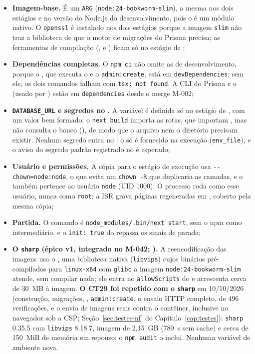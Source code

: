\begin{itemize}
  \item \textbf{Imagem-base.} É um \texttt{ARG} (\texttt{node:24-bookworm-slim}), a mesma nos dois estágios e na versão do Node.js do desenvolvimento, pois o  é um módulo nativo. O \texttt{openssl} é instalado nos dois estágios porque a imagem \texttt{slim} não traz a biblioteca de que o motor de migrações do Prisma precisa; as ferramentas de compilação (,  e ) ficam só no estágio de ;
  \item \textbf{Dependências completas.} O \texttt{npm ci} não omite as de desenvolvimento, porque o , que executa o  e o \texttt{admin:create}, está em \texttt{devDependencies}; sem ele, os dois comandos falham com \texttt{tsx: not found}. A CLI do Prisma e o  (usado por ) estão em \texttt{dependencies} desde o merge M-002;
  \item \textbf{\texttt{DATABASE\_URL} e segredos no .} A variável é definida só no estágio de , com um valor bem formado: o \texttt{next build} importa as rotas, que importam , mas não consulta o banco (), de modo que o arquivo nem o diretório precisam existir. Nenhum segredo entra no : o  só é fornecido na execução (\texttt{env\_file}), e o aviso do segredo padrão registrado no  é esperado;
  \item \textbf{Usuário e permissões.} A cópia para o estágio de execução usa \texttt{-{}-chown=node:node}, o que evita um \texttt{chown -R} que duplicaria as camadas, e o  também pertence ao usuário \texttt{node} (UID 1000). O processo roda como esse usuário, nunca como \texttt{root}; a ISR grava páginas regeneradas em , coberto pela mesma cópia;
  \item \textbf{Partida.} O comando é \texttt{node\_modules/.bin/next start}, sem o npm como intermediário, e o \texttt{init: true} do  repassa os sinais de parada;
  \item \textbf{O \texttt{sharp} (épico v1, integrado no M-042; ).} A reencodificação das imagens usa o , uma biblioteca nativa (\texttt{libvips}) cujos binários pré-compilados para \texttt{linux-x64} com \texttt{glibc} a imagem \texttt{node:24-bookworm-slim} atende, sem compilar nada; ele entra no \texttt{allowScripts} do  e acrescenta cerca de 30~MB à imagem. \textbf{O CT29 foi repetido com o \texttt{sharp}} em 10/10/2026 (construção, migrações, , \texttt{admin:create}, o ensaio HTTP completo, de 496 verificações, e o envio de imagens reais contra o contêiner, inclusive no navegador sob a CSP; Seção~\ref{sec:testes-nf} do Capítulo~\ref{cap:testes}): \texttt{sharp} 0.35.5 com \texttt{libvips} 8.18.7, imagem de 2,15~GB (780~s sem cache) e cerca de 150~MiB de memória em repouso; o \texttt{npm audit} o inclui. Nenhuma variável de ambiente nova.

\end{itemize}
